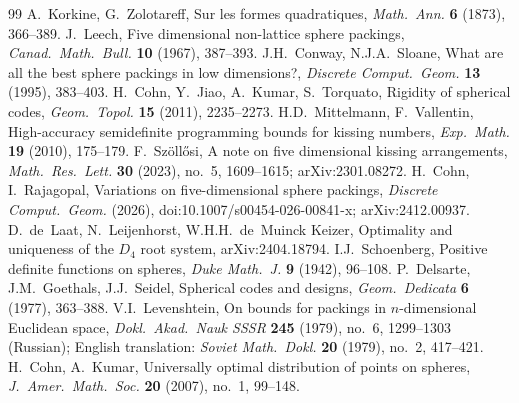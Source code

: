 \documentclass[11pt]{article}
\theoremstyle{remark}
\begin{document}
\begin{thebibliography}{99}
 A.~Korkine, G.~Zolotareff, Sur les formes quadratiques,
\emph{Math.\ Ann.} \textbf{6} (1873), 366--389.
 J.~Leech, Five dimensional non-lattice sphere
packings, \emph{Canad.\ Math.\ Bull.} \textbf{10} (1967), 387--393.
 J.H.~Conway, N.J.A.~Sloane, What are all the best
sphere packings in low dimensions?, \emph{Discrete Comput.\ Geom.}
\textbf{13} (1995), 383--403.
 H.~Cohn, Y.~Jiao, A.~Kumar, S.~Torquato, Rigidity of
spherical codes, \emph{Geom.\ Topol.} \textbf{15} (2011), 2235--2273.
 H.D.~Mittelmann, F.~Vallentin, High-accuracy
semidefinite programming bounds for kissing numbers,
\emph{Exp.\ Math.} \textbf{19} (2010), 175--179.
 F.~Sz\"oll\H{o}si, A note on five dimensional kissing
arrangements, \emph{Math.\ Res.\ Lett.} \textbf{30} (2023), no.~5,
1609--1615; arXiv:2301.08272.
 H.~Cohn, I.~Rajagopal, Variations on five-dimensional
sphere packings, \emph{Discrete Comput.\ Geom.} (2026),
doi:10.1007/s00454-026-00841-x; arXiv:2412.00937.
 D.~de~Laat, N.~Leijenhorst, W.H.H.~de~Muinck
Keizer, Optimality and uniqueness of the $D_4$ root system,
arXiv:2404.18794.
 I.J.~Schoenberg, Positive definite functions on
spheres, \emph{Duke Math.\ J.} \textbf{9} (1942), 96--108.
 P.~Delsarte, J.M.~Goethals, J.J.~Seidel, Spherical codes
and designs, \emph{Geom.\ Dedicata} \textbf{6} (1977), 363--388.
 V.I.~Levenshtein, On bounds for packings in
$n$-dimensional Euclidean space, \emph{Dokl.\ Akad.\ Nauk SSSR}
\textbf{245} (1979), no.~6, 1299--1303 (Russian); English translation:
\emph{Soviet Math.\ Dokl.} \textbf{20} (1979), no.~2, 417--421.
 H.~Cohn, A.~Kumar, Universally optimal distribution of
points on spheres, \emph{J.\ Amer.\ Math.\ Soc.} \textbf{20} (2007),
no.~1, 99--148.
\end{thebibliography}
\end{document}

